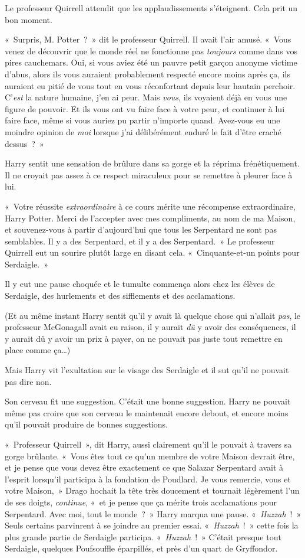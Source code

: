 Le professeur Quirrell attendit que les applaudissements s'éteignent.
Cela prit un bon moment.

«~Surpris, M. Potter~?~»
dit le professeur Quirrell.
Il avait l'air amusé.
«~Vous venez de découvrir que le monde réel ne fonctionne pas \emph{toujours} comme dans vos pires cauchemars.
Oui, si vous aviez été un pauvre petit garçon anonyme victime d'abus, alors ils vous auraient probablement respecté encore moins après ça, ils auraient eu pitié de vous tout en vous réconfortant depuis leur hautain perchoir.
C'\emph{est} la nature humaine, j'en ai peur.
Mais \emph{vous}, ils voyaient déjà en vous une figure de pouvoir.
Et ils vous ont vu faire face à votre peur, et continuer à lui faire face, même si vous auriez pu partir n'importe quand.
Avez-vous eu une moindre opinion de \emph{moi} lorsque j'ai délibérément enduré le fait d'être craché dessus~?~»

Harry sentit une sensation de brûlure dans sa gorge et la réprima frénétiquement.
Il ne croyait pas assez à ce respect miraculeux pour se remettre à pleurer face à lui.

«~Votre réussite \emph{extraordinaire} à ce cours mérite une récompense extraordinaire, Harry Potter.
Merci de l'accepter avec mes compliments, au nom de ma Maison, et souvenez-vous à partir d'aujourd'hui que tous les Serpentard ne sont pas semblables.
Il y a des Serpentard, et il y a des Serpentard.~»
Le professeur Quirrell eut un sourire plutôt large en disant cela.
«~Cinquante-et-un points pour Serdaigle.~»

Il y eut une pause choquée et le tumulte commença alors chez les élèves de Serdaigle, des hurlements et des sifflements et des acclamations.

(Et au même instant Harry sentit qu'il y avait là quelque chose qui n'allait \emph{pas}, le professeur McGonagall avait eu raison, il y aurait \emph{dû} y avoir des conséquences, il y aurait dû y avoir un prix à payer, on ne pouvait pas juste tout remettre en place comme ça…)

Mais Harry vit l'exultation sur le visage des Serdaigle et il sut qu'il ne pouvait pas dire non.

Son cerveau fit une suggestion.
C'était une bonne suggestion.
Harry ne pouvait même pas croire que son cerveau le maintenait encore debout, et encore moins qu'il pouvait produire de bonnes suggestions.

«~Professeur Quirrell~», dit Harry, aussi clairement qu'il le pouvait à travers sa gorge brûlante.
«~Vous êtes tout ce qu'un membre de votre Maison devrait être, et je pense que vous devez être exactement ce que Salazar Serpentard avait à l'esprit lorsqu'il participa à la fondation de Poudlard.
Je vous remercie, vous et votre Maison,~» Drago hochait la tête très doucement et tournait légèrement l'un de ses doigts, \emph{continue}, «~et je pense que ça mérite trois acclamations pour Serpentard.
Avec moi, tout le monde~?~»
Harry marqua une pause.
«~\emph{Huzzah}~!~»
 Seuls certains parvinrent à se joindre au premier essai.
«~\emph{Huzzah}~!~»
cette fois la plus grande partie de Serdaigle participa.
«~\emph{Huzzah}~!~»
C'était presque tout Serdaigle, quelques Poufsouffle éparpillés, et près d'un quart de Gryffondor.

